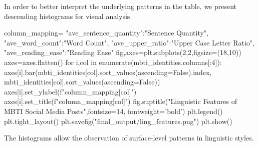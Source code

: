 \documentclass[12pt]{article}
\numberwithin{figure}{section}  %
\begin{document}
	In order to better interpret the underlying patterns in the table, we
	present descending histograms for visual analysis.
	\begin{python}
column_mapping={
    "ave_sentence_quantity":"Sentence Quantity",
    "ave_word_count":"Word Count",
    "ave_upper_ratio":"Upper Case Letter Ratio",
    "ave_reading_ease":"Reading Ease"
}
fig,axes=plt.subplots(2,2,figsize=(18,10))
axes=axes.flatten()
for i,col in enumerate(mbti_identities.columns[:4]):
    axes[i].bar(mbti_identities[col].sort_values(ascending=False).index, mbti_identities[col].sort_values(ascending=False))
    axes[i].set_ylabel(f"{column_mapping[col]}")
    axes[i].set_title(f"{column_mapping[col]}")
fig.suptitle("Linguistic Features of MBTI Social Media Posts",fontsize=14, fontweight='bold')
plt.legend()
plt.tight_layout()
plt.savefig("final_output/ling_features.png")
plt.show()
	\end{python}
\begin{figure}[H]
    \centering
\end{figure}
	The histograms allow the observation of surface-level patterns in linguistic styles.
\end{document}
